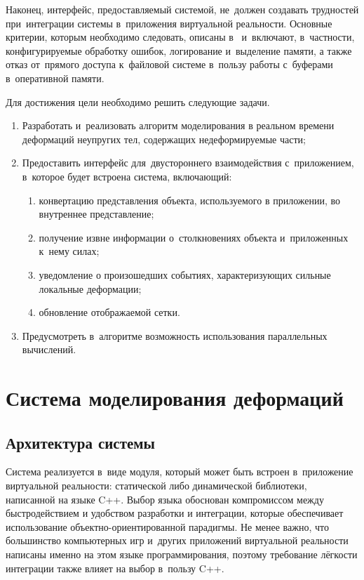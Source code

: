 \documentclass[a4paper, 14pt, titlepage]{extarticle}
\begin{document}
    Наконец, интерфейс, предоставляемый системой, не~должен создавать трудностей при~интеграции
    системы в~приложения виртуальной реальности. Основные критерии, которым необходимо следовать,
    описаны в~\cite{gems-middleware} и~включают, в~частности, конфигурируемые обработку ошибок,
    логирование и~выделение памяти, а также отказ от~прямого доступа к~файловой системе в~пользу
    работы с~буферами в~оперативной памяти.

    Для достижения цели необходимо решить следующие задачи.
    \begin{enumerate}
      \item Разработать и~реализовать алгоритм моделирования в реальном времени деформаций
        не\-у\-пру\-гих тел, содержащих недеформируемые части;
      \item Предоставить интерфейс для~двустороннего взаимодействия с~приложением, в~которое будет
        встроена система, включающий:
        \begin{enumerate}
          \item конвертацию представления объекта, используемого в приложении, во внутреннее представление;
          \item получение извне информации о~столкновениях объекта и~приложенных к~нему силах;
          \item уведомление о произошедших событиях, характеризующих сильные локальные деформации;
          \item обновление отображаемой сетки.
        \end{enumerate}
      \item Предусмотреть в~алгоритме возможность использования параллельных вычислений.
    \end{enumerate}

  \section{Система моделирования деформаций}
    \subsection{Архитектура системы}

      Система реализуется в~виде модуля, который может быть встроен в~приложение виртуальной
      реальности: статической либо динамической библиотеки, написанной на языке C++. Выбор языка
      обоснован компромиссом между быстродействием и удобством разработки и интеграции, которые
      обеспечивает использование объектно-ориентированной парадигмы. Не менее важно, что большинство
      компьютерных игр и~других приложений виртуальной реальности написаны именно на этом языке
      программирования, поэтому требование лёгкости интеграции также влияет на выбор в~пользу C++.
\end{document}

